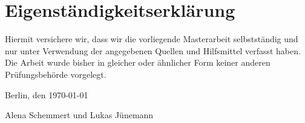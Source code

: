 \chapter*{Eigenständigkeitserklärung}

Hiermit versichere wir, dass wir die vorliegende Masterarbeit selbstständig und nur unter
Verwendung der angegebenen Quellen und Hilfsmittel verfasst haben. Die Arbeit wurde bisher
in gleicher oder ähnlicher Form keiner anderen Prüfungsbehörde vorgelegt.

\vskip 1cm

Berlin, den \today

\vskip 1.5cm

Alena Schemmert und Lukas Jünemann